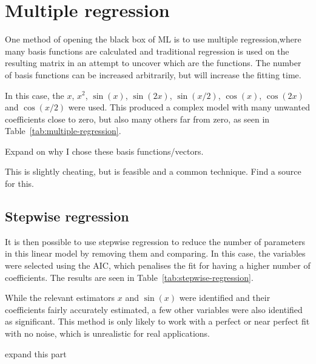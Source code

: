 \section{Multiple regression}

One method of opening the black box of \ac{ML} is to use multiple regression,where many basis functions are calculated and traditional regression is used on the resulting matrix in an attempt to uncover which are the  functions.
The number of basis functions can be increased arbitrarily, but will increase the fitting time. 

In this case, the  \(x\), \(x^2\), \(\sin(x)\), \(\sin(2x)\), \(\sin(x/2)\), \(\cos(x)\), \(\cos(2x)\) and \(\cos(x/2)\) were used.
This produced a complex model with many unwanted coefficients close to zero, but also many others far from zero, as seen in Table~\ref{tab:multiple-regression}.

\begin{todo}
	Expand on why I chose these basis functions/vectors.
\end{todo}


\begin{todo}
	This is slightly cheating, but is feasible and a common technique. Find a source for this.
\end{todo}

\subsection{Stepwise regression}

It is then possible to use stepwise regression to reduce the number of parameters in this linear model by removing them and comparing.
In this case, the variables were selected using the \ac{AIC}, which penalises the fit for having a higher number of coefficients.
The results are seen in Table~\ref{tab:stepwise-regression}.


While the relevant estimators \(x\) and \(\sin(x)\) were identified and their coefficients fairly accurately estimated, a few other variables were also identified as significant.
This method is only likely to work with a perfect or near perfect fit with no noise, which is unrealistic for real applications.

\begin{todo}
	expand this part
\end{todo}

